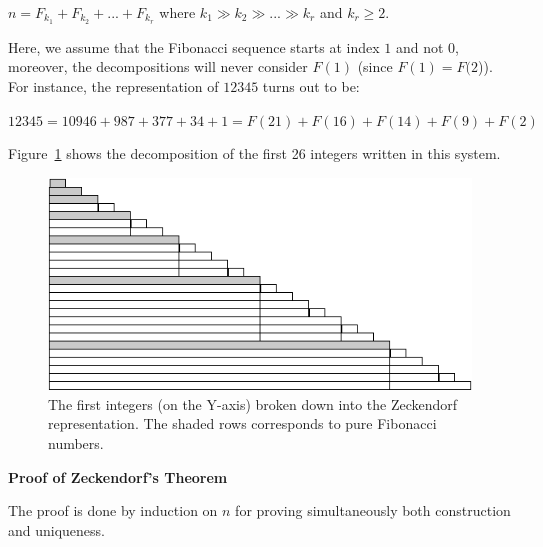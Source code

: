 $n = F_{k_1} + F_{k_2} + ... + F_{k_r}$ where $k_1 \gg k_2 \gg ... \gg k_r$ and $k_r \geq 2$.

Here, we assume that the Fibonacci sequence starts at index $1$ and not $0$,
moreover, the decompositions will never consider $F(1)$ (since $F(1)=F(2$)). 
For instance, the representation of $12345$ turns out to be:

$12345 = 10946 + 987 + 377 + 34 + 1 = F(21) + F(16) + F(14) + F(9) + F(2)$
\bigskip

Figure~\ref{zeckendorf} shows the decomposition of the first 26 integers written in this system. 
\begin{figure}[h]
\begin{center}
        \includegraphics[scale=0.6]{FiguresArithmetic/Zeckendorf}
        \caption{The first integers (on the Y-axis) broken down into the Zeckendorf representation.
        The shaded rows corresponds to pure Fibonacci numbers.}
\label{zeckendorf}
\end{center}
\end{figure}

\noindent \textbf{Proof of Zeckendorf's Theorem}

The proof is done by induction on $n$ for proving simultaneously both construction and uniqueness.

